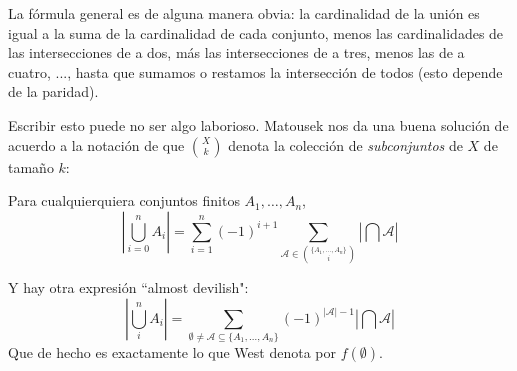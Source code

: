 \documentclass[spanish]{book}
\theoremstyle{definition}
\begin{document}
La fórmula general es de alguna manera obvia: la cardinalidad de la unión es igual a la suma de la cardinalidad de cada conjunto, menos las cardinalidades de las intersecciones de a dos, más las intersecciones de a tres, menos las de a cuatro, ..., hasta que sumamos o restamos la intersección de todos (esto depende de la paridad).

Escribir esto puede no ser algo laborioso. Matousek nos da una buena solución de acuerdo a la notación de que ${X\choose k}$ denota la colección de \textit{subconjuntos} de $X$ de tamaño $k$:
\begin{teo}
	Para cualquierquiera conjuntos finitos $A_1,\ldots,A_n$,
	\[\left|\bigcup_{i=0}^nA_i\right|=\sum_{i=1}^n(-1)^{i+1}\sum_{\mathcal{A}\in{\{A_1,\ldots,A_n\}\choose i}}\left|\bigcap \mathcal{A}\right|\]
\end{teo}
Y hay otra expresión ``almost devilish":
\[\left|\bigcup_i^nA_i\right|=\sum_{\emptyset\neq\mathcal{A}\subseteq \{A_1,\ldots,A_n\}}(-1)^{|\mathcal{A}|-1}\left|\bigcap\mathcal{A}\right|\]
Que de hecho es exactamente lo que West denota por $f(\emptyset)$.
\end{document}
